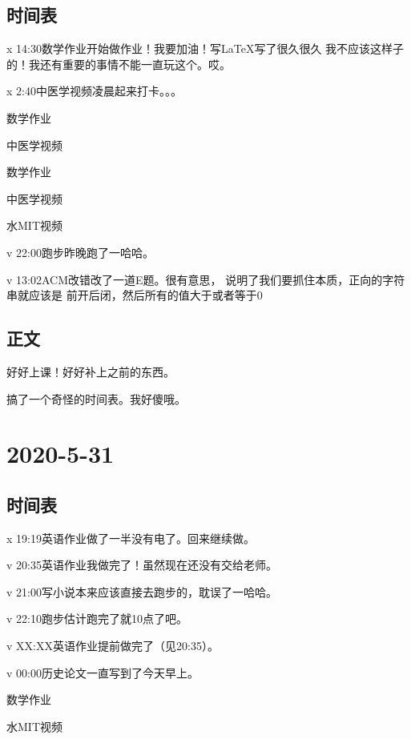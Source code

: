 \documentclass{peterlitsdoc}
\begin{document}
\subsection{时间表}
\begin{pltplan}
\item[x]{14:30}{数学作业}{开始做作业！我要加油！写\LaTeX{}写了很久很久
    我不应该这样子的！我还有重要的事情不能一直玩这个。哎。}
\item[x]{2:40}{中医学视频}{凌晨起来打卡。。。}
\item[ ]{}{数学作业}{}
\item[ ]{}{中医学视频}{}
\item[ ]{}{数学作业}{}
\item[ ]{}{中医学视频}{}
\item[ ]{}{水MIT视频}{}
\item[v]{22:00}{跑步}{昨晚跑了一哈哈。}
\item[v]{13:02}{ACM改错}{改了一道E题。很有意思，
    说明了我们要抓住本质，正向的字符串就应该是
    前开后闭，然后所有的值大于或者等于0}
\end{pltplan}

\subsection{正文}

好好上课！好好补上之前的东西。

搞了一个奇怪的时间表。我好傻哦。

\section{2020-5-31}

\subsection{时间表}

\begin{pltplan}
\item[x]{19:19}{英语作业}{做了一半没有电了。回来继续做。}
\item[v]{20:35}{英语作业}{我做完了！虽然现在还没有交给老师。}
\item[v]{21:00}{写小说}{本来应该直接去跑步的，耽误了一哈哈。}
\item[v]{22:10}{跑步}{估计跑完了就10点了吧。}
\item[v]{XX:XX}{英语作业}{提前做完了（见20:35）。}
\item[v]{00:00}{历史论文}{一直写到了今天早上。}
\item[ ]{}{数学作业}{}
\item[ ]{}{水MIT视频}{}
\end{pltplan}
\end{document}
